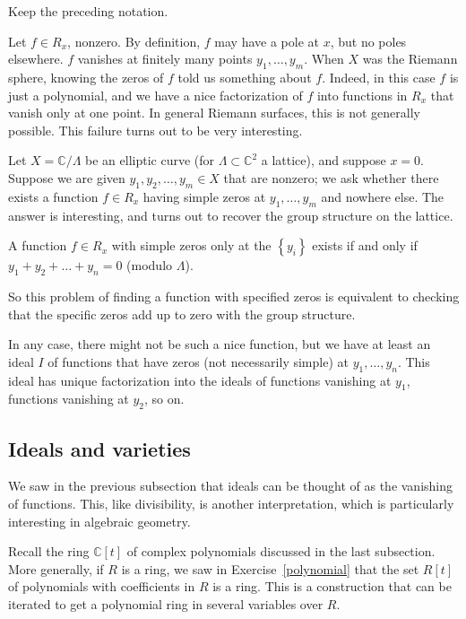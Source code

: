 \begin{example} Keep the preceding notation.

Let $f \in R_x$, nonzero. By definition, $f$ may have a pole at $x$, but no poles elsewhere. $f$ vanishes
at finitely many points $y_1, \dots, y_m$. When $X$ was the Riemann sphere,
knowing the zeros of $f$ told us something about $f$. Indeed, in this case
$f$ is just a
polynomial, and we have a nice factorization of $f$ into functions in $R_x$ that vanish only
at one point. In general Riemann surfaces, this
is not generally possible.  This failure turns out to be very interesting.

Let $X = \mathbb{C}/\Lambda$ be an elliptic curve (for $\Lambda \subset
\mathbb{C}^2$ a lattice), and suppose $x = 0$. Suppose we
are given $y_1, y_2, \dots, y_m \in X$ that are nonzero; we ask whether there
exists a function $f \in R_x$ having simple zeros at $y_1, \dots, y_m$ and nowhere else.
The answer is interesting, and turns out to recover the group structure on the
lattice.

\begin{proposition} 
A function $f \in R_x$ with simple zeros only at the $\left\{y_i\right\}$ exists if and only if $y_1 + y_2 + \dots + y_n = 0$ (modulo $\Lambda$).

\end{proposition} 
So this problem of finding a function with specified zeros is equivalent to
checking that the specific zeros add up to zero with the group structure.

In any case, there might not be such a nice function, but we have at least an
ideal $I$ of functions that have zeros (not necessarily simple) at $y_1, \dots,
y_n$.  This ideal has unique factorization into the ideals of functions
vanishing at $y_1$, functions vanishing at $y_2$, so on.  
\end{example} 


\subsection{Ideals and varieties}

We saw in the previous subsection that ideals can be thought of as the
vanishing of functions. This, like divisibility, is another interpretation,
which is particularly interesting in algebraic geometry.


Recall the  ring $\mathbb{C}[t]$ of complex polynomials discussed in the
last subsection. More generally, if $R$ is a ring,  we saw in
Exercise~\ref{polynomial} that the set $R[t]$ of polynomials with coefficients
in $R$
is a ring.  This is a construction that
can be iterated to get a polynomial ring in several variables over $R$.

